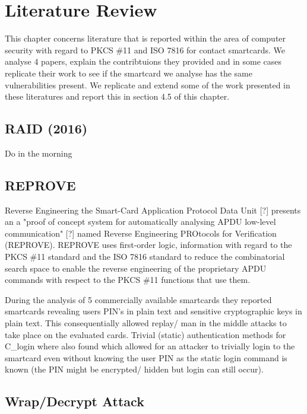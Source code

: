 \documentclass[bsc,frontabs,twoside,singlespacing,parskip,deptreport]{infthesis}     %
\begin{document}

\chapter{Literature Review}

This chapter concerns literature that is reported within the area of computer security with regard to PKCS \#11 and ISO 7816 for contact smartcards. We analyse 4 papers, explain the contribtuions they provided and in some cases replicate their work to see if the smartcard we analyse has the same vulnerabilities present. We replicate and extend some of the work presented in these literatures and report this in section 4.5 of this chapter.

\section{RAID (2016)}

Do in the morning

\section{REPROVE}

Reverse Engineering the Smart-Card Application Protocol Data Unit [?] presents an a "proof of concept system for automatically analysing APDU low-level communication" [?] named Reverse Engineering PROtocols for Verification (REPROVE). REPROVE uses first-order logic, information with regard to the PKCS \#11 standard and the ISO 7816 standard to reduce the combinatorial search space to enable the reverse engineering of the proprietary APDU commands with respect to the PKCS \#11 functions that use them.

During the analysis of 5 commercially available smartcards they reported smartcards revealing users PIN's in plain text and sensitive cryptographic keys in plain text. This consequentially allowed replay/ man in the middle attacks to take place on the evaluated cards. Trivial (static) authentication methods for C\_login where also found which allowed for an attacker to trivially login to the smartcard even without knowing the user PIN as the static login command is known (the PIN might be encrypted/ hidden but login can still occur).


\section{Wrap/Decrypt Attack}
\end{document}
